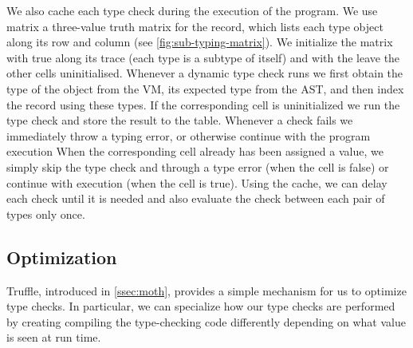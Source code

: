 We also cache each type check during the execution of the program.
We use matrix a three-value truth matrix for the record, 
which lists each type object along its row and column (see \cref{fig:sub-typing-matrix}).
We initialize the matrix with true along its trace (each type is a subtype of itself) and 
with the leave the other cells uninitialised.
Whenever a dynamic type check runs we first obtain the type of the object from the VM, 
its expected type from the AST,
and then index the record using these types.
If the corresponding cell is uninitialized
we run the type check and store the result to the table.
Whenever a check fails we immediately throw a typing error, or otherwise
continue with the program execution 
When the corresponding cell already has been assigned a value,
we simply skip the type check and through a type error (when the cell is false)
or continue with execution (when the cell is true).
Using the cache, we can delay each check until it is needed and 
also evaluate the check between each pair of types only once.


\subsection{Optimization}

Truffle, introduced in \cref{ssec:moth}, provides a simple mechanism for us to optimize type checks.
In particular,
we can specialize how our type checks are performed by creating compiling the type-checking code
differently depending on what value is seen at run time.
